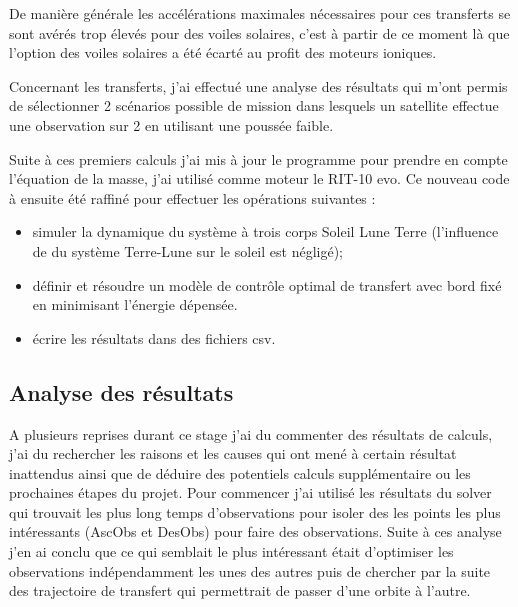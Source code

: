 \documentclass[12pt]{article} %
\begin{document}
		De manière générale les accélérations maximales nécessaires pour ces transferts se sont avérés trop élevés pour des voiles solaires, c'est à partir de ce moment là que l'option des voiles solaires a été écarté au profit des moteurs ioniques.	
		
		Concernant les transferts, j'ai effectué une analyse des résultats qui m'ont permis de sélectionner 2 scénarios possible de mission dans lesquels un satellite effectue une observation sur 2 en utilisant une poussée faible.
		
		Suite à ces premiers calculs j'ai mis à jour le programme pour prendre en compte l'équation de la masse, j'ai utilisé comme moteur le RIT-10 evo. Ce nouveau code à ensuite été raffiné pour effectuer les opérations suivantes : 
		
		\begin{itemize}
			\item simuler la dynamique du système à trois corps Soleil Lune Terre (l'influence de du système Terre-Lune sur le soleil est négligé);
			\item définir et résoudre un modèle de contrôle optimal de transfert avec bord fixé en minimisant l'énergie dépensée.
			\item écrire les résultats dans des fichiers csv.
		\end{itemize}
		
		\subsection{Analyse des résultats}
		
		A plusieurs reprises durant ce stage j'ai du commenter des résultats de calculs, j'ai du rechercher les raisons et les causes qui ont mené à certain résultat inattendus ainsi que de déduire des potentiels calculs supplémentaire ou les prochaines étapes du projet. Pour commencer j'ai utilisé les résultats du solver qui trouvait les plus long temps d'observations pour isoler des les points les plus intéressants  (\gls{AscObs} et \gls{DesObs}) pour faire des observations. Suite à ces analyse j'en ai conclu que ce qui semblait le plus intéressant était d'optimiser les observations indépendamment les unes des autres puis de chercher par la suite des trajectoire de transfert qui permettrait de passer d'une orbite à l'autre.
		
\end{document}
